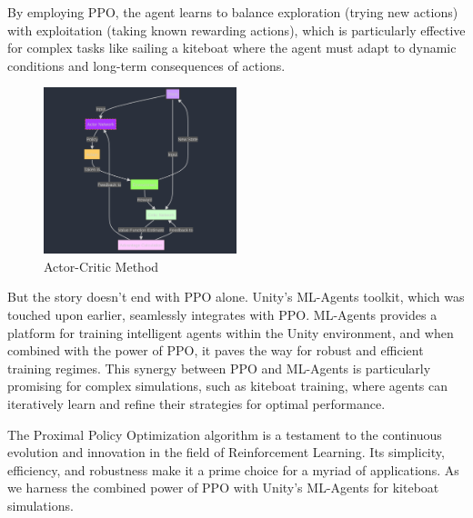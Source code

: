 By employing PPO, the agent learns to balance exploration (trying new actions) with exploitation (taking known rewarding actions), which is particularly effective for complex tasks like sailing a kiteboat where the agent must adapt to dynamic conditions and long-term consequences of actions.

\begin{figure}
    \centering
    \includegraphics[width=0.5\textwidth]{Images/ppo_explanation.png}
    \caption{Actor-Critic Method}\label{actor_critic}
\end{figure}

But the story doesn't end with PPO alone. Unity's ML-Agents toolkit, which was touched upon earlier, seamlessly integrates with PPO. ML-Agents provides a platform for training intelligent agents within the Unity environment, and when combined with the power of PPO, it paves the way for robust and efficient training regimes. This synergy between PPO and ML-Agents is particularly promising for complex simulations, such as kiteboat training, where agents can iteratively learn and refine their strategies for optimal performance.

The Proximal Policy Optimization algorithm is a testament to the continuous evolution and innovation in the field of Reinforcement Learning. Its simplicity, efficiency, and robustness make it a prime choice for a myriad of applications. As we harness the combined power of PPO with Unity's ML-Agents for kiteboat simulations.




